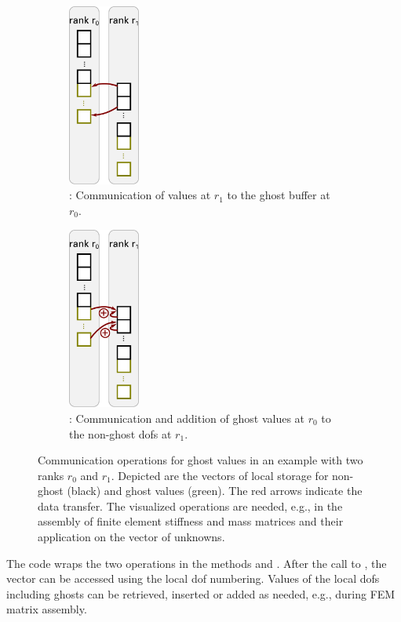 \begin{figure}%
  \centering%
  \begin{subfigure}[t]{0.45\textwidth}%
    \centering%
    \includegraphics[height=6cm]{images/implementation/1d_comm1.pdf}
    \caption{: Communication of values at $r_1$ to the ghost buffer at $r_0$.}%
    \label{fig:1d_comm1}%
  \end{subfigure}
  \quad
  \begin{subfigure}[t]{0.45\textwidth}%
    \centering%
    \includegraphics[height=6cm]{images/implementation/1d_comm2.pdf}
    \caption{: Communication and addition of ghost values at $r_0$ to the non-ghost dofs at $r_1$.}%
    \label{fig:1d_comm2}%
  \end{subfigure}
  \caption{Communication operations for ghost values in an example with two ranks $r_0$ and $r_1$. Depicted are the vectors of local storage for non-ghost (black) and ghost values (green). The red arrows indicate the data transfer. The visualized operations are needed, e.g., in the assembly of finite element stiffness and mass matrices and their application on the vector of unknowns.}%
  \label{fig:1d_comm}%
\end{figure}%
The \opendihu{} code wraps the two operations in the methods  and . After the call to , the vector can be accessed using the local dof numbering. Values of the local dofs including ghosts can be retrieved, inserted or added as needed, e.g., during FEM matrix assembly. 
